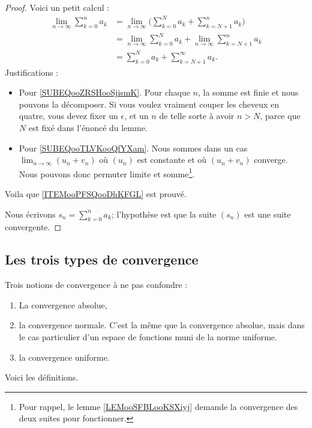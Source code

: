 \begin{proof}
    Voici un petit calcul :
    \begin{subequations}
        \begin{align}
            \lim_{n\to \infty} \sum_{k=0}^na_k&=\lim_{n\to \infty} \big( \sum_{k=0}^Na_k+\sum_{k=N+1}^{n}a_k \big)      \label{SUBEQooZRSHooSjismK}\\
            &=\lim_{n\to \infty} \sum_{k=0}^{N}a_k+\lim_{n\to \infty} \sum_{k=N+1}^{n}a_k       \label{SUBEQooTLVKooQfYXam}\\
            &=\sum_{k=0}^Na_k+\sum_{k=N+1}^{\infty}a_k.
        \end{align}
    \end{subequations}
    Justifications :
    \begin{itemize}
        \item Pour \eqref{SUBEQooZRSHooSjismK}. Pour chaque \( n\), la somme est finie et nous pouvons la décomposer. Si vous voulez vraiment couper les cheveux en quatre, vous devez fixer un \( \epsilon\), et un \( n\) de telle sorte à avoir \( n>N\), parce que \( N\) est fixé dans l'énoncé du lemme.
        \item Pour \eqref{SUBEQooTLVKooQfYXam}. Nous sommes dans un cas \( \lim_{n\to \infty}(u_n+v_n) \) où \( (u_n)\) est constante et où \( (u_n+v_n)\) converge. Nous pouvons donc permuter limite et somme\footnote{Pour rappel, le lemme \ref{LEMooSFBLooKSXiyj} demande la convergence des deux suites pour fonctionner.}.
    \end{itemize}
    Voila que \ref{ITEMooPFSQooDhKFGL} est prouvé.

    Nous écrivons \( s_n=\sum_{k=0}^na_k\); l'hypothèse est que la suite \( (s_n)\) est une suite convergente.
\end{proof}

\subsection{Les trois types de convergence}

Trois notions de convergence à ne pas confondre :
\begin{enumerate}
    \item
        La convergence absolue,
    \item
        la convergence normale. C'est la même que la convergence absolue, mais dans le cas particulier d'un espace de fonctions muni de la norme uniforme.
    \item
        la convergence uniforme.
\end{enumerate}
Voici les définitions.


